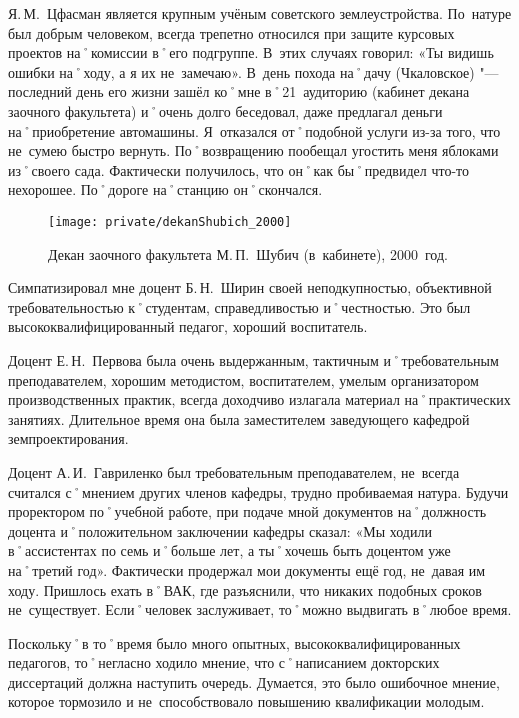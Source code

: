 Я.\,М.~Цфасман является крупным учёным советского землеустройства. По~натуре был добрым человеком, всегда трепетно относился при защите курсовых проектов на˚комиссии в˚его подгруппе. В~этих случаях говорил: «Ты видишь ошибки на˚ходу, а я их не~замечаю». В~день похода на˚дачу (Чкаловское) "--- последний день его жизни зашёл ко˚мне в˚21~аудиторию (кабинет декана заочного факультета) и˚очень долго беседовал, даже предлагал деньги на˚приобретение автомашины. Я~отказался от˚подобной услуги из-за того, что не~сумею быстро вернуть. По˚возвращению пообещал угостить меня яблоками из˚своего сада. Фактически получилось, что он˚как бы˚предвидел что-то нехорошее. По˚дороге на˚станцию он˚скончался.

\begin{figure}[h]
\texttt{[image: private/dekanShubich\_2000]}
\caption{Декан заочного факультета М.\,П.~Шубич (в~кабинете), 2000~год.}
\label{fig:dekanShubich_2000}
\end{figure}

Симпатизировал мне доцент Б.\,Н.~Ширин своей неподкупностью, объективной требовательностью к˚студентам, справедливостью и˚честностью. Это был высококвалифицированный педагог, хороший воспитатель.

Доцент Е.\,Н.~Первова была очень выдержанным, тактичным и˚требовательным преподавателем, хорошим методистом, воспитателем, умелым организатором производственных практик, всегда доходчиво излагала материал на˚практических занятиях. Длительное время она была заместителем заведующего кафедрой земпроектирования.

Доцент А.\,И.~Гавриленко был требовательным преподавателем, не~всегда считался с˚мнением других членов кафедры, трудно пробиваемая натура. Будучи проректором по˚учебной работе, при подаче мной документов на˚должность доцента и˚положительном заключении кафедры сказал: «Мы ходили в˚ассистентах по семь и˚больше лет, а ты˚хочешь быть доцентом уже на˚третий год». Фактически продержал мои документы ещё год, не~давая им ходу. Пришлось ехать в˚ВАК, где разъяснили, что никаких подобных сроков не~существует. Если˚человек заслуживает, то˚можно выдвигать в˚любое время.

Поскольку˚в то˚время было много опытных, высококвалифицированных педагогов, то˚негласно ходило мнение, что с˚написанием докторских диссертаций должна наступить очередь. Думается, это было ошибочное мнение, которое тормозило и не~способствовало повышению квалификации молодым.

